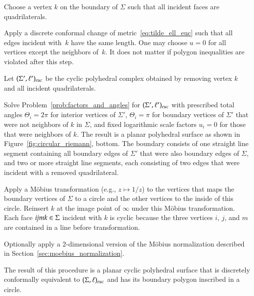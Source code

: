 \documentclass[Thesis]{subfiles}
\begin{document}
\begin{compactenum}[(1)]
\item Choose a vertex $k$ on the boundary of $\Sigma$ such that all
  incident faces are quadrilaterals.
\item Apply a discrete conformal change of
  metric~\eqref{eq:tilde_ell_euc} such that all edges incident
  with~$k$ have the same length. One may choose $u=0$ for all
  vertices except the neighbors of~$k$. It does not matter if polygon
  inequalities are violated after this step.
\item Let $(\Sigma',\ell')_{\euc}$ be the cyclic polyhedral complex obtained by 
  removing vertex $k$ and all incident quadrilaterals.
\item Solve Problem~\ref{prob:factors_and_angles} for
  $(\Sigma',\ell')_{\euc}$ with prescribed total angles
  $\Theta_i=2\pi$ for interior vertices of $\Sigma'$, $\Theta_i=\pi$
  for boundary vertices of $\Sigma'$ that were not neighbors of $k$ in
  $\Sigma$, and fixed logarithmic scale factors $u_i=0$ for those that
  were neighbors of $k$. The result is a planar polyhedral surface as
  shown in Figure~\ref{fig:circular_riemann}, bottom. The boundary
  consists of one straight line segment containing all boundary edges
  of $\Sigma'$ that were also boundary edges of $\Sigma$, and two or
  more straight line segments, each consisting of two edges that were
  incident with a removed quadrilateral.
\item Apply a M{\"o}bius transformation (e.g., $z\mapsto 1/z$) to the
  vertices that maps the boundary vertices of $\Sigma$ to a circle and
  the other vertices to the inside of this circle. Reinsert $k$ at the image
  point of $\infty$ under this M{\"o}bius transformation. Each face
  ${\it ijmk} \in \Sigma$ incident with $k$ is cyclic because the three
  vertices $i$, $j$, and $m$ are contained in a line before
  transformation.
\item Optionally apply a 2-dimensional version of the M{\"o}bius
  normalization described in Section~\ref{sec:moebius_normalization}.
\end{compactenum} 

\begin{proposition}
  \label{prop:riemann_map}
  The result of this procedure is a planar cyclic polyhedral surface
  that is discretely conformally equivalent to $(\Sigma, \ell)_{\euc}$
  and has its boundary polygon inscribed in a circle.
\end{proposition}
\end{document}
